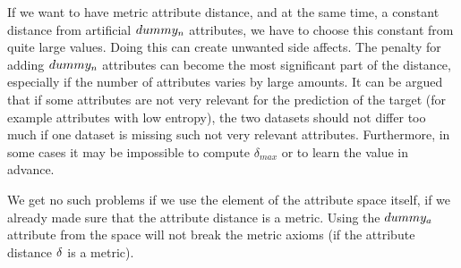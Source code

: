 If we want to have metric attribute distance, and at the same time, a constant distance from artificial $dummy_n$ attributes, we have to choose this constant from quite large values. Doing this can create unwanted side affects. The penalty for adding $dummy_n$ attributes can become the most significant part of the distance, especially if the number of attributes varies by large amounts. It can be argued that if some attributes are not very relevant for the prediction of the target (for example attributes with low entropy), the two datasets should not differ too much if one dataset is missing such not very relevant attributes. Furthermore, in some cases it may be impossible to compute $\delta_{max}$ or to learn the value in advance. 

We get no such problems if we use the element of the attribute space itself, if we already made sure that the attribute distance is a metric. Using the $dummy_a$ attribute from the space will not break the metric axioms (if the attribute distance $\delta$ is a metric).

